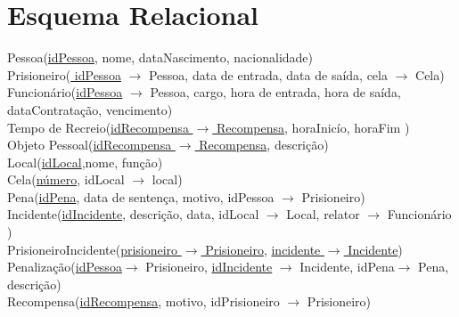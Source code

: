 \documentclass{article}
\begin{document}
\section{Esquema Relacional}
Pessoa(\underline{idPessoa}, nome, dataNascimento, nacionalidade)\\
Prisioneiro(\underline{ idPessoa} $\rightarrow$ Pessoa, data de entrada, data de saída, cela $\rightarrow$ Cela)\\
Funcionário(\underline{idPessoa} $\rightarrow$ Pessoa, cargo, hora de entrada, hora de saída, dataContratação, vencimento)\\
Tempo de Recreio(\underline{idRecompensa $\rightarrow$ Recompensa}, horaInicío, horaFim )\\
Objeto Pessoal(\underline{idRecompensa $\rightarrow$ Recompensa}, descrição)\\
Local(\underline{idLocal},nome, função)\\
Cela(\underline{número}, idLocal $\rightarrow$ local)\\
Pena(\underline{idPena}, data de sentença, motivo, idPessoa $\rightarrow$ Prisioneiro)\\
Incidente(\underline{idIncidente}, descrição, data, idLocal $\rightarrow$ Local, relator $\rightarrow$ Funcionário )\\
PrisioneiroIncidente(\underline{prisioneiro $\rightarrow$ Prisioneiro}, \underline{incidente $\rightarrow$ Incidente})\\
Penalização(\underline{idPessoa}$\rightarrow$ Prisioneiro, \underline{idIncidente} $\rightarrow$ Incidente, {idPena}$\rightarrow$ Pena, descrição)\\
Recompensa(\underline{idRecompensa}, motivo, idPrisioneiro $\rightarrow$ Prisioneiro)\\








	
\end{document}
